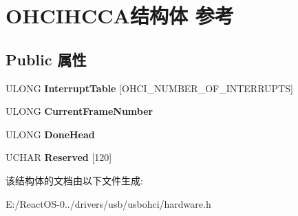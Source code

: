 \hypertarget{struct_o_h_c_i_h_c_c_a}{}\section{O\+H\+C\+I\+H\+C\+C\+A结构体 参考}
\label{struct_o_h_c_i_h_c_c_a}
\subsection*{Public 属性}
\begin{DoxyCompactItemize}
\item 
\mbox{\label{struct_o_h_c_i_h_c_c_a_a2511aa0cb10704f2d80da812fe798915}} 
U\+L\+O\+NG {\bfseries Interrupt\+Table} \mbox{[}O\+H\+C\+I\+\_\+\+N\+U\+M\+B\+E\+R\+\_\+\+O\+F\+\_\+\+I\+N\+T\+E\+R\+R\+U\+P\+TS\mbox{]}
\item 
\mbox{\label{struct_o_h_c_i_h_c_c_a_a0a4888e5dc18dccc2d87e7e481b50dc2}} 
U\+L\+O\+NG {\bfseries Current\+Frame\+Number}
\item 
\mbox{\label{struct_o_h_c_i_h_c_c_a_a0ed09c535d70e769b48fc7afea6f2d5a}} 
U\+L\+O\+NG {\bfseries Done\+Head}
\item 
\mbox{\label{struct_o_h_c_i_h_c_c_a_aa0503e8b75a9d2b2125488c62a7ac9e3}} 
U\+C\+H\+AR {\bfseries Reserved} \mbox{[}120\mbox{]}
\end{DoxyCompactItemize}


该结构体的文档由以下文件生成\+:\begin{DoxyCompactItemize}
\item 
E\+:/\+React\+O\+S-\/0../drivers/usb/usbohci/hardware.\+h\end{DoxyCompactItemize}
